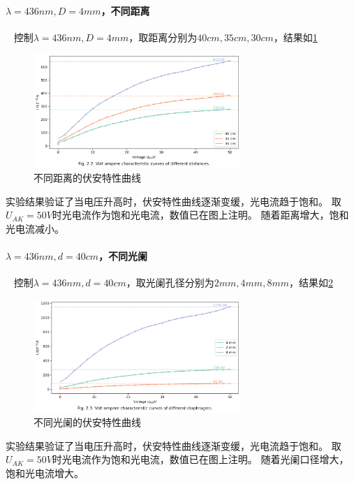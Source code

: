 \documentclass[12pt,a4paper,UTF8]{ctexart}
\begin{document}
    \paragraph{$\lambda=436nm, D=4mm$，不同距离}~
    \newline
    \indent
    控制$\lambda=436nm, D=4mm$，取距离分别为$40cm, 35cm, 30cm$，结果如\ref{fig:2.2}
    \begin{figure}[htbp]
        \centering
        \includegraphics[width=0.7\textwidth]{attachments/fig.2.2.png}
        \caption{不同距离的伏安特性曲线}
        \label{fig:2.2}
    \end{figure}
    实验结果验证了当电压升高时，伏安特性曲线逐渐变缓，光电流趋于饱和。
    取$U_{AK} = 50V$时光电流作为饱和光电流，数值已在图上注明。
    随着距离增大，饱和光电流减小。    
    
    \paragraph{$\lambda=436nm, d=40cm$，不同光阑}~
    \newline
    \indent
    控制$\lambda=436nm, d=40cm$，取光阑孔径分别为$2mm, 4mm, 8mm$，结果如\ref{fig:2.3}
    \begin{figure}[htbp]
        \centering
        \includegraphics[width=0.7\textwidth]{attachments/fig.2.3.png}
        \caption{不同光阑的伏安特性曲线}
        \label{fig:2.3}
    \end{figure}
    实验结果验证了当电压升高时，伏安特性曲线逐渐变缓，光电流趋于饱和。
    取$U_{AK} = 50V$时光电流作为饱和光电流，数值已在图上注明。
    随着光阑口径增大，饱和光电流增大。    
    
\end{document}
